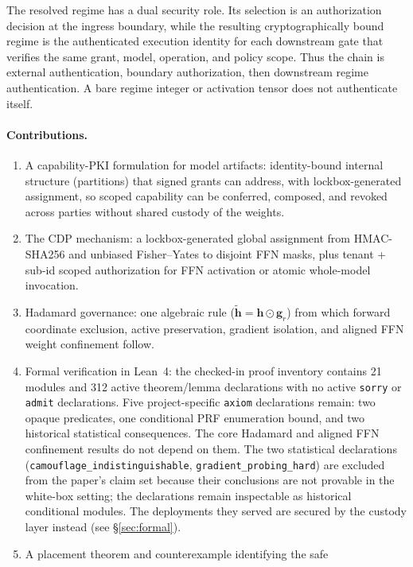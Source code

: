 \documentclass[11pt,a4paper]{article}
\newcommand{\bh}{\mathbf{h}}
\newcommand{\bg}{\mathbf{g}}
\begin{document}
The resolved regime has a dual security role.  Its selection is an
authorization decision at the ingress boundary, while the resulting
cryptographically bound regime is the authenticated execution identity
for each downstream gate that verifies the same grant, model, operation,
and policy scope.  Thus the chain is external authentication, boundary
authorization, then downstream regime authentication.  A bare regime
integer or activation tensor does not authenticate itself.

\paragraph{Contributions.}
\begin{enumerate}[nosep]
    \item A capability-PKI formulation for model artifacts:
    identity-bound internal structure (partitions) that signed grants
    can address, with lockbox-generated assignment, so scoped
    capability can be conferred, composed, and revoked across parties
    without shared custody of the weights.
    \item The CDP mechanism: a lockbox-generated global assignment
    from HMAC-SHA256 and unbiased Fisher--Yates to disjoint FFN masks,
    plus tenant + sub-id scoped authorization for FFN activation or
    atomic whole-model invocation.
    \item Hadamard governance: one algebraic rule
    ($\tilde{\bh} = \bh \odot \bg_r$) from which forward coordinate
    exclusion, active preservation, gradient isolation, and aligned
    FFN weight confinement follow.
    \item Formal verification in Lean~4: the checked-in proof
    inventory contains 21 modules and 312 active theorem/lemma declarations
    with no active \texttt{sorry} or \texttt{admit} declarations.  Five
    project-specific \texttt{axiom} declarations remain: two opaque
    predicates, one conditional PRF enumeration bound, and two historical
    statistical consequences.  The core Hadamard and aligned FFN confinement
    results do not depend on them.  The two statistical declarations
    (\texttt{camouflage\_indistinguishable},
    \texttt{gradient\_probing\_hard}) are excluded from the paper's claim set
    because their conclusions are not provable in the white-box setting; the
    declarations remain inspectable as historical conditional modules.  The
    deployments they served are secured by the custody layer instead (see
    \S\ref{sec:formal}).
    \item A placement theorem and counterexample identifying the safe

\end{enumerate}
\end{document}
